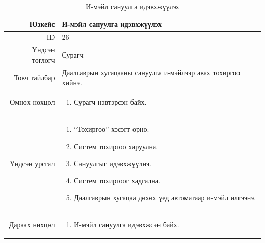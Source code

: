 \begin{longtable}{|r|p{11cm}|}
\caption{И-мэйл сануулга идэвхжүүлэх}
\label{table:usecase26}\\ \hline
Юзкейс & И-мэйл сануулга идэвхжүүлэх \\ \hline
ID & 26 \\ \hline
Үндсэн тоглогч & Сурагч \\ \hline
Товч тайлбар & Даалгаврын хугацааны
сануулга и-мэйлээр авах тохиргоо хийнэ.
\\ \hline
Өмнөх нөхцөл &
\begin{enumerate}[nosep]
\item Сурагч нэвтэрсэн байх.
\end{enumerate} \\ \hline
Үндсэн урсгал &
\begin{enumerate}[nosep]
\item ``Тохиргоо'' хэсэгт орно.
\item Систем тохиргоо харуулна.
\item Сануулгыг идэвхжүүлнэ.
\item Систем тохиргоог хадгална.
\item Даалгаврын хугацаа дөхөх үед
автоматаар и-мэйл илгээнэ.
\end{enumerate} \\ \hline
Дараах нөхцөл &
\begin{enumerate}[nosep]
\item И-мэйл сануулга идэвхжсэн байх.
\end{enumerate} \\ \hline
\end{longtable}

